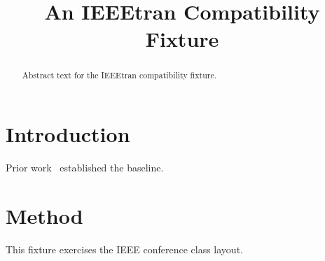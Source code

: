 \documentclass[conference]{IEEEtran}
\begin{document}
\title{An IEEEtran Compatibility Fixture}
\author{}

\maketitle

\begin{abstract}
Abstract text for the IEEEtran compatibility fixture.
\end{abstract}

\section{Introduction}
Prior work~\cite{smith2025,doe2024} established the baseline.

\section{Method}
This fixture exercises the IEEE conference class layout.



\end{document}
